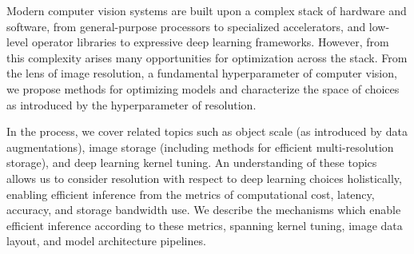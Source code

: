 Modern computer vision systems are built upon a complex stack of hardware and software, from general-purpose processors to specialized accelerators, and low-level operator libraries to expressive deep learning frameworks.
However, from this complexity arises many opportunities for optimization across the stack.
From the lens of image resolution, a fundamental hyperparameter of computer vision, we propose methods for optimizing models and characterize the space of choices as introduced by the hyperparameter of resolution.

In the process, we cover related topics such as object scale (as introduced by data augmentations), image storage (including methods for efficient multi-resolution storage), and deep learning kernel tuning.
An understanding of these topics allows us to consider resolution with respect to deep learning choices holistically, enabling efficient inference from the metrics of computational cost, latency, accuracy, and storage bandwidth use.
We describe the mechanisms which enable efficient inference according to these metrics, spanning kernel tuning, image data layout, and model architecture pipelines.
